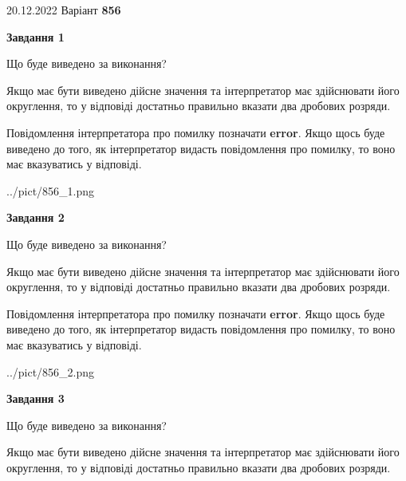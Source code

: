 \documentclass[12pt, ukrainian]{article}
\begin{document}
{20.12.2022 Варіант \No \textbf { 856 }\par}
{
\begin {Large}

{\begin {center}\textbf{Завдання 1}\end {center}}\par
Що буде виведено за виконання? \par

Якщо має бути виведено дійсне значення та інтерпретатор має здійснювати його округлення, 
то у відповіді достатньо правильно вказати два дробових розряди.

Повідомлення інтерпретатора про помилку позначати \textbf{error}.
Якщо щось буде виведено до того, як інтерпретатор видасть повідомлення про помилку, 
то воно має вказуватись у відповіді. \par

\begin{center}
	{../pict/856_1.png}
\end{center}
\newpage

{\begin {center}\textbf{Завдання 2}\end {center}}\par
Що буде виведено за виконання? \par

Якщо має бути виведено дійсне значення та інтерпретатор має здійснювати його округлення, 
то у відповіді достатньо правильно вказати два дробових розряди.

Повідомлення інтерпретатора про помилку позначати \textbf{error}.
Якщо щось буде виведено до того, як інтерпретатор видасть повідомлення про помилку, 
то воно має вказуватись у відповіді. \par

\begin{center}
	{../pict/856_2.png}
\end{center}
\newpage

{\begin {center}\textbf{Завдання 3}\end {center}}\par
Що буде виведено за виконання? \par

Якщо має бути виведено дійсне значення та інтерпретатор має здійснювати його округлення, 
то у відповіді достатньо правильно вказати два дробових розряди.


\end{Large}}
\end{document}
